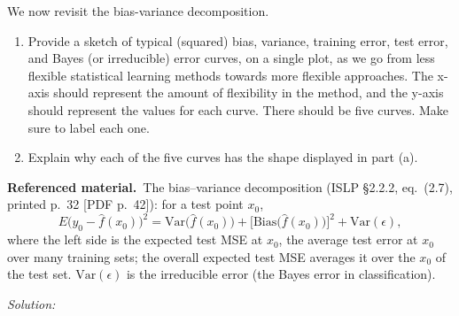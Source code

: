 \documentclass[11pt,a4paper]{article}
\newif\ifsolucoes
\newcommand{\espacoresol}{3.5cm}   %
\numberwithin{equation}{questao}   %
\newenvironment{refmat}{\par\smallskip\noindent\begin{small}\textbf{Referenced material.}\ }{\end{small}\par\smallskip}
\newcommand{\resolespaco}{\ifsolucoes\else\par\textit{Solution:}\vspace{\espacoresol}\par\fi}
\begin{document}
We now revisit the bias-variance decomposition.
\begin{enumerate}[label=(\alph*)]
\item Provide a sketch of typical (squared) bias, variance, training error, test error, and Bayes
(or irreducible) error curves, on a single plot, as we go from less flexible statistical
learning methods towards more flexible approaches. The x-axis should represent the amount of
flexibility in the method, and the y-axis should represent the values for each curve. There
should be five curves. Make sure to label each one.
\item Explain why each of the five curves has the shape displayed in part (a).
\end{enumerate}
\begin{refmat}The bias--variance decomposition (ISLP §2.2.2, eq.~(2.7), printed p.~32 [PDF p.~42]):
for a test point $x_0$,
\[E\big(y_0-\hat f(x_0)\big)^2=\mathrm{Var}\big(\hat f(x_0)\big)+\big[\mathrm{Bias}\big(\hat f(x_0)\big)\big]^2+\mathrm{Var}(\epsilon),\]
where the left side is the expected test MSE at $x_0$, the average test error at $x_0$ over many
training sets; the overall expected test MSE averages it over the $x_0$ of the test set.
$\mathrm{Var}(\epsilon)$ is the irreducible error (the Bayes error in classification).\end{refmat}
\resolespaco
\end{document}
